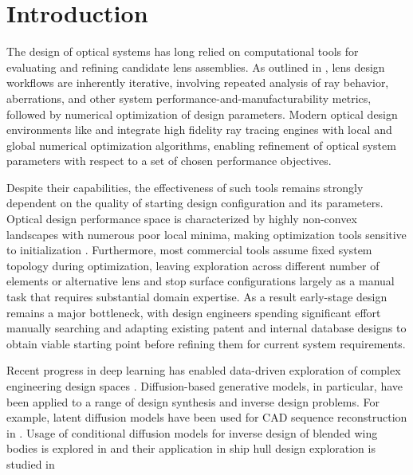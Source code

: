 \section{Introduction}

The design of optical systems has long relied on computational tools for evaluating and refining candidate lens assemblies. As outlined in \cite{Smith2008ModernOpticalEngineering}, lens design workflows are inherently iterative, involving repeated analysis of ray behavior, aberrations, and other system performance-and-manufacturability metrics, followed by numerical optimization of design parameters. Modern optical design environments like \cite{codev} and \cite{zemax_opticstudio} integrate high fidelity ray tracing engines with local and global numerical optimization algorithms, enabling refinement of optical system parameters with respect to a set of chosen performance objectives.

Despite their capabilities, the effectiveness of such tools remains strongly dependent on the quality of starting design configuration and its parameters. Optical design performance space is characterized by highly non-convex landscapes with numerous poor local minima, making optimization tools sensitive to initialization \cite{Turnhout:09}. Furthermore, most commercial tools assume fixed system topology during optimization, leaving exploration across different number of elements or alternative lens and stop surface configurations largely as a manual task that requires substantial domain expertise. As a result early-stage design remains a major bottleneck, with design engineers spending significant effort manually searching and adapting existing patent and internal database designs to obtain viable starting point before refining them for current system requirements.

Recent progress in deep learning has enabled data-driven exploration of complex engineering design spaces \cite{regenwetter2022deepgenerativemodelsengineering}. Diffusion-based generative models, in particular, have been applied to a range of design synthesis and inverse design problems. For example, latent diffusion models have been used for CAD sequence reconstruction in \cite{alam2025gencadimageconditionedcomputeraideddesign}.
Usage of conditional diffusion models for inverse design of blended wing bodies is explored in \cite{blendednet_pp_Sung_2025} and their application in ship hull design exploration is studied in \cite{bagazinski2023shipgendiffusionmodelparametric}

